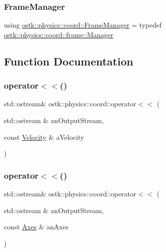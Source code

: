 \subsubsection{\texorpdfstring{Frame\+Manager}{FrameManager}}
{\footnotesize\ttfamily using \hyperlink{namespaceostk_1_1physics_1_1coord_ab147ada31124a59de8f25da43781195b}{ostk\+::physics\+::coord\+::\+Frame\+Manager} = typedef \hyperlink{classostk_1_1physics_1_1coord_1_1frame_1_1_manager}{ostk\+::physics\+::coord\+::frame\+::\+Manager}}



\subsection{Function Documentation}
\mbox{\label{namespaceostk_1_1physics_1_1coord_ae9f09f080ab2c16e20579dbd585aaadc}} 
\subsubsection{\texorpdfstring{operator$<$$<$()}{operator<<()}\hspace{0.1cm}{\footnotesize\ttfamily [1/5]}}
{\footnotesize\ttfamily std\+::ostream\& ostk\+::physics\+::coord\+::operator$<$$<$ (\begin{DoxyParamCaption}\item[{std\+::ostream \&}]{an\+Output\+Stream,  }\item[{const \hyperlink{classostk_1_1physics_1_1coord_1_1_velocity}{Velocity} \&}]{a\+Velocity }\end{DoxyParamCaption})}

\mbox{\label{namespaceostk_1_1physics_1_1coord_ae664540b70d257ba9392b7697e6deffa}} 
\subsubsection{\texorpdfstring{operator$<$$<$()}{operator<<()}\hspace{0.1cm}{\footnotesize\ttfamily [2/5]}}
{\footnotesize\ttfamily std\+::ostream\& ostk\+::physics\+::coord\+::operator$<$$<$ (\begin{DoxyParamCaption}\item[{std\+::ostream \&}]{an\+Output\+Stream,  }\item[{const \hyperlink{classostk_1_1physics_1_1coord_1_1_axes}{Axes} \&}]{an\+Axes }\end{DoxyParamCaption})}


